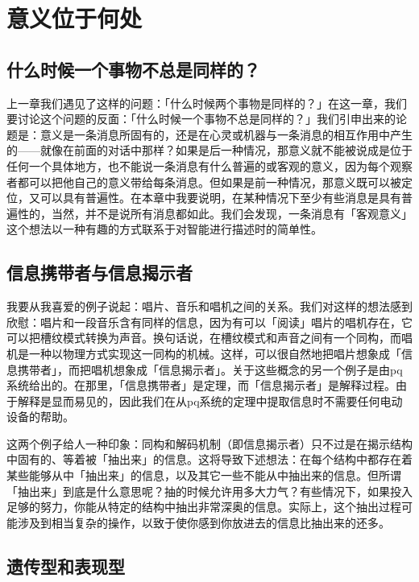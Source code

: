 \documentclass[
  12pt,
  twoside,
  openright,
  oldfontcommands,
]{memoir}
\begin{document}
\chapter{意义位于何处}

\section{什么时候一个事物不总是同样的？}

上一章我们遇见了这样的问题：「什么时候两个事物是同样的？」在这一章，我们要讨论这个问题的反面：「什么时候一个事物不总是同样的？」我们引申出来的论题是：意义是一条消息所固有的，还是在心灵或机器与一条消息的相互作用中产生的------就像在前面的对话中那样？如果是后一种情况，那意义就不能被说成是位于任何一个具体地方，也不能说一条消息有什么普遍的或客观的意义，因为每个观察者都可以把他自己的意义带给每条消息。但如果是前一种情况，那意义既可以被定位，又可以具有普遍性。在本章中我要说明，在某种情况下至少有些消息是具有普遍性的，当然，并不是说所有消息都如此。我们会发现，一条消息有「客观意义」这个想法以一种有趣的方式联系于对智能进行描述时的简单性。

\section{信息携带者与信息揭示者}

我要从我喜爱的例子说起：唱片、音乐和唱机之间的关系。我们对这样的想法感到欣慰：唱片和一段音乐含有同样的信息，因为有可以「阅读」唱片的唱机存在，它可以把槽纹模式转换为声音。换句话说，在槽纹模式和声音之间有一个同构，而唱机是一种以物理方式实现这一同构的机械。这样，可以很自然地把唱片想象成「信息携带者」，而把唱机想象成「信息揭示者」。关于这些概念的另一个例子是由pq系统给出的。在那里，「信息携带者」是定理，而「信息揭示者」是解释过程。由于解释是显而易见的，因此我们在从pq系统的定理中提取信息时不需要任何电动设备的帮助。

这两个例子给人一种印象：同构和解码机制（即信息揭示者）只不过是在揭示结构中固有的、等着被「抽出来」的信息。这将导致下述想法：在每个结构中都存在着某些能够从中「抽出来」的信息，以及其它一些不能从中抽出来的信息。但所谓「抽出来」到底是什么意思呢？抽的时候允许用多大力气？有些情况下，如果投入足够的努力，你能从特定的结构中抽出非常深奥的信息。实际上，这个抽出过程可能涉及到相当复杂的操作，以致于使你感到你放进去的信息比抽出来的还多。

\section{遗传型和表现型}
\end{document}
